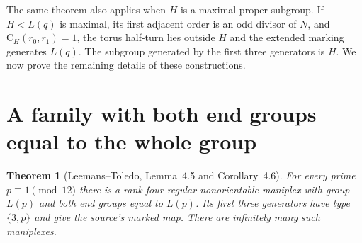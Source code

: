 \documentclass[11pt]{article}
\newtheorem{theorem}{Theorem}
\newcommand{\CG}{\mathrm C}
\begin{document}
The same theorem also applies when $H$ is a maximal proper subgroup. If
$H<L(q)$ is maximal, its first adjacent order is an odd divisor of $N$,
and $\CG_H(r_0,r_1)=1$, the torus half-turn lies outside $H$ and the
extended marking generates $L(q)$. The subgroup generated by the first three generators is
$H$. We now prove the remaining details of these constructions.

\section{A family with both end groups equal to the whole group}
\begin{theorem}[Leemans--Toledo, Lemma~4.5 and Corollary~4.6]
\label{thm:full-family}
For every prime $p\equiv1\pmod{12}$ there is a rank-four regular
nonorientable maniplex with group $L(p)$ and both end groups equal to
$L(p)$. Its first three generators have type $\{3,p\}$ and give the
source's marked map. There are infinitely many such maniplexes.
\end{theorem}
\end{document}
